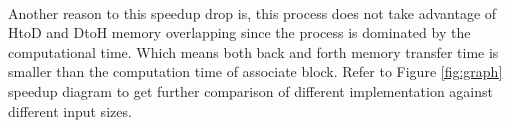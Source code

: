 \\Another reason to this speedup drop is, this process does not take advantage of HtoD and DtoH memory overlapping since the process is dominated by the computational time. Which means both back and forth memory transfer time is smaller than the computation time of associate block. Refer to Figure \ref{fig:graph} speedup diagram to get further comparison of different implementation against different input sizes.
